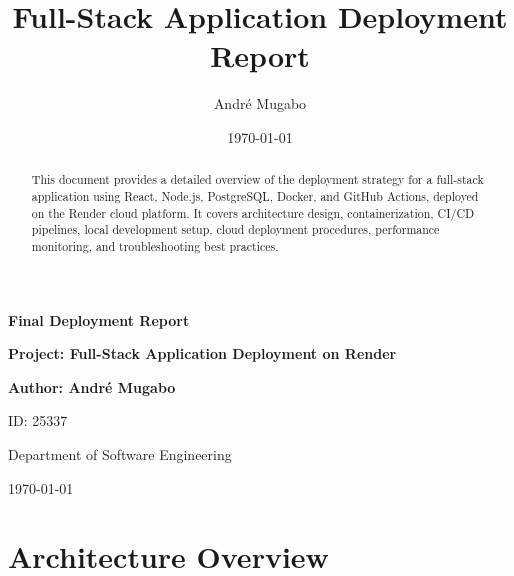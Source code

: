 \documentclass[12pt]{article}
\title{Full-Stack Application Deployment Report}
\author{André Mugabo}
\date{\today}
\begin{document}
\begin{titlepage}
    \centering
    \vspace*{2.5cm} 
    
    
    {\Huge\bfseries\sffamily\color{primary} Final Deployment Report\par}
    \vspace{0.5cm}
    
    {\LARGE\bfseries\sffamily Project: Full-Stack Application Deployment on Render\par}
    \vspace{1cm}
    
    {\large\bfseries\sffamily Author: André Mugabo\par}
    {\large ID: 25337\par}
    {\large Department of Software Engineering\par}
    
    \vfill
    
    {\large \today\par}
\end{titlepage}

\newpage
\begin{abstract}
This document provides a detailed overview of the deployment strategy for a full-stack application using React, Node.js, PostgreSQL, Docker, and GitHub Actions, deployed on the Render cloud platform. It covers architecture design, containerization, CI/CD pipelines, local development setup, cloud deployment procedures, performance monitoring, and troubleshooting best practices.
\end{abstract}

\newpage
\tableofcontents
\newpage

\section{Architecture Overview}
\end{document}
